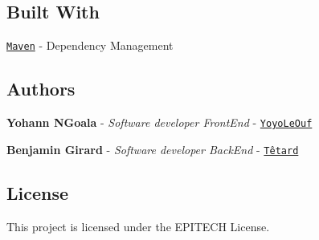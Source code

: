 \subsection*{Built With}


\begin{DoxyItemize}
\item \href{https://maven.apache.org/}{\tt Maven} -\/ Dependency Management
\end{DoxyItemize}

\subsection*{Authors}


\begin{DoxyItemize}
\item {\bfseries Yohann N\textquotesingle{}Goala} -\/ {\itshape Software developer Front\+End} -\/ \href{https://github.com/YohannNgoala}{\tt Yoyo\+Le\+Ouf}
\item {\bfseries Benjamin Girard} -\/ {\itshape Software developer Back\+End} -\/ \href{https://github.com/BenjaminGirard}{\tt Têtard}
\end{DoxyItemize}

\subsection*{License}

This project is licensed under the E\+P\+I\+T\+E\+CH License. 